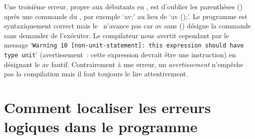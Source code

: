 Une troisième erreur, propre aux débutants en \ocaml, est d'oublier les parenthèses 
{\idt ()} après une commande du \robot, par exemple `{\idt av;}' au lieu de 
`{\idt av ();}'. Le programme est syntaxiquement correct mais le \robot\ n'avance pas 
car {\idt av} sans {\idt ()} désigne la commande sans demander de l'exécuter. 
Le compilateur nous avertit cependant par le message 
`{\tt Warning 10 [non-unit-statement]: this expression should have type unit}' 
(avertissement~: cette expression devrait être une instruction) en désignant le {\idt av} fautif. 
Contrairement à une erreur, un {\em avertissement} n'empêche pas la compilation 
mais il faut toujours le lire attentivement.

\section{Comment localiser les erreurs logiques dans le programme} 

